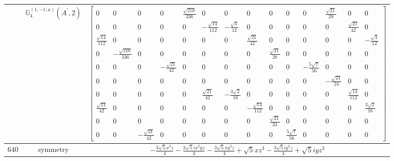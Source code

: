 \documentclass[fleqn,8pt,landscape]{jsarticle}
\begin{document}
\begin{longtable}{ccc}
$  $ & $ \mathbb{G}_{4}^{(1,-1;a)}(A^{\prime},2) $ & $ \begin{bmatrix} 0 & 0 & 0 & 0 & \frac{\sqrt{210}}{336} & 0 & 0 & 0 & 0 & 0 & 0 & \frac{\sqrt{21}}{28} & 0 & 0 \\ 0 & 0 & 0 & 0 & 0 & - \frac{\sqrt{14}}{112} & - \frac{\sqrt{3}}{12} & 0 & 0 & 0 & 0 & 0 & \frac{\sqrt{21}}{42} & 0 \\ \frac{\sqrt{14}}{112} & 0 & 0 & 0 & 0 & 0 & 0 & \frac{\sqrt{21}}{42} & 0 & 0 & 0 & 0 & 0 & - \frac{\sqrt{3}}{12} \\ 0 & - \frac{\sqrt{210}}{336} & 0 & 0 & 0 & 0 & 0 & 0 & \frac{\sqrt{21}}{28} & 0 & 0 & 0 & 0 & 0 \\ 0 & 0 & 0 & - \frac{\sqrt{21}}{42} & 0 & 0 & 0 & 0 & 0 & 0 & - \frac{5 \sqrt{7}}{56} & 0 & 0 & 0 \\ 0 & 0 & 0 & 0 & 0 & 0 & 0 & 0 & 0 & 0 & 0 & - \frac{\sqrt{21}}{24} & 0 & 0 \\ 0 & 0 & 0 & 0 & 0 & \frac{\sqrt{21}}{42} & - \frac{3 \sqrt{2}}{16} & 0 & 0 & 0 & 0 & 0 & \frac{\sqrt{14}}{112} & 0 \\ \frac{\sqrt{21}}{42} & 0 & 0 & 0 & 0 & 0 & 0 & - \frac{\sqrt{14}}{112} & 0 & 0 & 0 & 0 & 0 & \frac{3 \sqrt{2}}{16} \\ 0 & 0 & 0 & 0 & 0 & 0 & 0 & 0 & \frac{\sqrt{21}}{24} & 0 & 0 & 0 & 0 & 0 \\ 0 & 0 & - \frac{\sqrt{21}}{42} & 0 & 0 & 0 & 0 & 0 & 0 & \frac{5 \sqrt{7}}{56} & 0 & 0 & 0 & 0 \end{bmatrix} $ \\ \hline
$ 640 $ & $ \text{symmetry} $ & $ - \frac{3 \sqrt{5} x^{3} z}{4} - \frac{3 \sqrt{5} i x^{2} y z}{4} - \frac{3 \sqrt{5} x y^{2} z}{4} + \sqrt{5} x z^{3} - \frac{3 \sqrt{5} i y^{3} z}{4} + \sqrt{5} i y z^{3} $ \\

\end{longtable}
\end{document}
